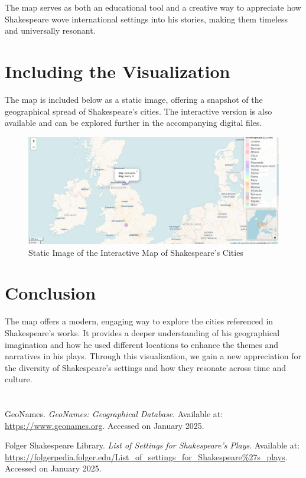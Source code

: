 \documentclass[a4paper,12pt]{article}
\begin{document}
The map serves as both an educational tool and a creative way to appreciate how Shakespeare wove international settings into his stories, making them timeless and universally resonant.

\section*{\color{shakespeareblue}Including the Visualization}
The map is included below as a static image, offering a snapshot of the geographical spread of Shakespeare’s cities. The interactive version is also available and can be explored further in the accompanying digital files.

\begin{figure}[ht]
    \centering
    \includegraphics[width=0.8\linewidth]{MapPopUps.png}
    \caption{Static Image of the Interactive Map of Shakespeare's Cities}
    \label{fig:map}
\end{figure}


\section*{\color{shakespeareblue}Conclusion}
The map offers a modern, engaging way to explore the cities referenced in Shakespeare's works. It provides a deeper understanding of his geographical imagination and how he used different locations to enhance the themes and narratives in his plays. Through this visualization, we gain a new appreciation for the diversity of Shakespeare's settings and how they resonate across time and culture.

\newpage
\section*{\color{shakespeareblue}}

\sloppy
\begin{thebibliography}{99}
\raggedright
{}
GeoNames. \textit{GeoNames: Geographical Database}. Available at: \url{https://www.geonames.org}. Accessed on January 2025.

Folger Shakespeare Library. \textit{List of Settings for Shakespeare's Plays}. Available at: \url{https://folgerpedia.folger.edu/List_of_settings_for_Shakespeare%27s_plays}. Accessed on January 2025.
\end{thebibliography}
\end{document}
